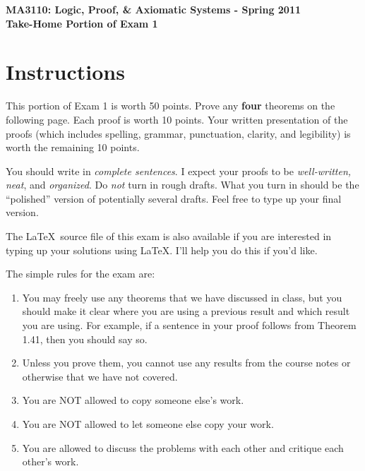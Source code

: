 \documentclass[11pt]{article}
\theoremstyle{definition}
\begin{document}
\begin{center}

{\Large\bf MA3110: Logic, Proof, \& Axiomatic Systems - Spring 2011}\\
\smallskip
{\Large\bf Take-Home Portion of Exam 1}

\bigskip


\end{center}

\setlength{\fboxsep}{10pt}

\section*{Instructions}

This portion of Exam 1 is worth 50 points.  Prove any \textbf{four} theorems on the following page.  Each proof is worth 10 points.  Your written presentation of the proofs (which includes spelling, grammar, punctuation, clarity, and legibility) is worth the remaining 10 points.

\bigskip

You should write in \emph{complete sentences}.  I expect your proofs to be \emph{well-written, neat}, and \emph{organized}.  Do \emph{not} turn in rough drafts.  What you turn in should be the ``polished'' version of potentially several drafts.  Feel free to type up your final version.  

\bigskip

The \LaTeX\ source file of this exam is also available if you are interested in typing up your solutions using \LaTeX.  I'll help you do this if you'd like.

\bigskip

The simple rules for the exam are:

\begin{enumerate}
\item You may freely use any theorems that we have discussed in class, but you should make it clear where you are using a previous result and which result you are using.  For example, if a sentence in your proof follows from Theorem 1.41, then you should say so.
\item Unless you prove them, you cannot use any results from the course notes or otherwise that we have not covered.
\item You are NOT allowed to copy someone else's work.
\item You are NOT allowed to let someone else copy your work.
\item You are allowed to discuss the problems with each other and critique each other's work.
\end{enumerate}
\end{document}
